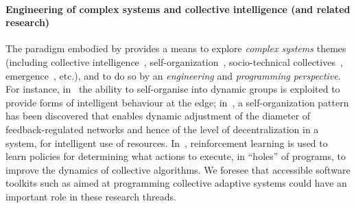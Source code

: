 \paragraph*{Engineering of complex systems and collective intelligence (and related research)}
%
The paradigm embodied by \scafi{}
 provides a means 
 to explore \emph{complex systems} themes~\cite{mobus2014principles-systems-science} 
 (including collective intelligence~\cite{DBLP:journals/access/HePLMC19}, self-organization~\cite{yates2012selforg}, socio-technical collectives~\cite{miorandi2014social-collective-intelligence}, emergence~\cite{DBLP:journals/jocec/KalantariNM20}, etc.),
 and to do so by an \emph{engineering} and \emph{programming perspective}.
%
For instance, in~\cite{DBLP:journals/eaai/CasadeiVAPD21}
 the ability to self-organise into dynamic groups 
 is exploited to provide forms of intelligent behaviour at the edge;
 in~\cite{DBLP:journals/fgcs/PianiniCVN21}, 
 a self-organization pattern has been discovered
 that enables dynamic adjustment of the diameter of feedback-regulated networks and hence of the level of decentralization in a system, for intelligent use of resources.
%
In~\cite{DBLP:conf/coordination/AguzziCV22},
 reinforcement learning
 is used to learn policies
 for determining what actions to execute, in ``holes'' of \scafi{} programs,
 to improve the dynamics of collective algorithms.
%
%
We foresee that 
 accessible software toolkits
 such as \scafi{}
 aimed at programming 
 collective adaptive systems
 could have an important role in these research threads.
